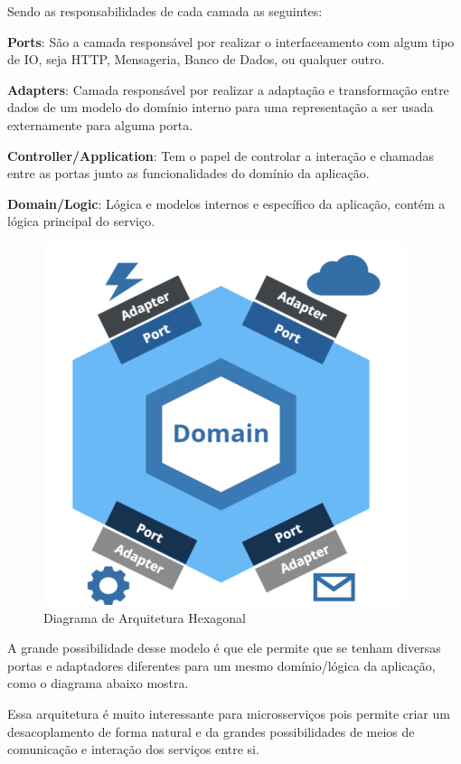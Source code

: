 	Sendo as responsabilidades de cada camada as seguintes:
	
	\textbf{Ports}: São a camada responsável por realizar o interfaceamento com algum tipo de IO, seja HTTP, Mensageria, Banco de Dados, ou qualquer outro.
	
	\textbf{Adapters}: Camada responsável por realizar a adaptação e transformação entre dados de um modelo do domínio interno para uma representação a ser usada externamente para alguma porta.
	
	\textbf{Controller/Application}: Tem o papel de controlar a interação e chamadas entre as portas junto as funcionalidades do domínio da aplicação.
	
	\textbf{Domain/Logic}: Lógica e modelos internos e específico da aplicação, contém a lógica principal do serviço.
	
	\begin{figure}[htpb]
	    \caption{Diagrama de Arquitetura Hexagonal}
	    \begin{center}
	        \includegraphics[scale=0.6]{pictures/hexagonal1.png}
	    \end{center}
	    \label{fig:hexagonal1}
	\end{figure}

	A grande possibilidade desse modelo é que ele permite que se tenham diversas portas e adaptadores diferentes para um mesmo domínio/lógica da aplicação, como o diagrama abaixo mostra.
	
	Essa arquitetura é muito interessante para microsserviços pois permite criar um desacoplamento de forma natural e da grandes possibilidades de meios de comunicação e interação dos serviços entre si.
	
